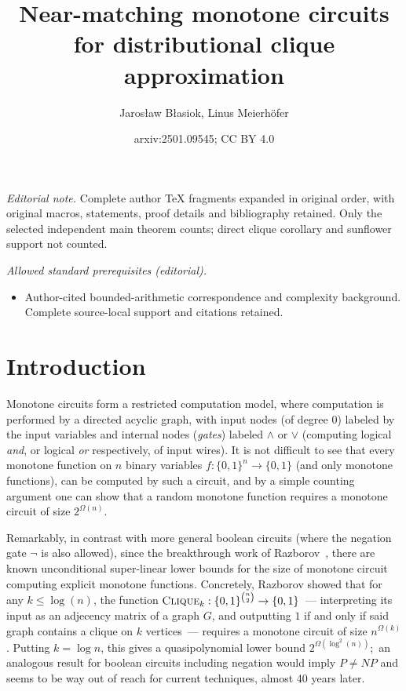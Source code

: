 \documentclass[10pt,a4paper]{article}
\title{Near-matching monotone circuits for distributional clique approximation}
\author{Jarosław Błasiok, Linus Meierhöfer}
\date{arxiv:2501.09545; CC BY 4.0}
\newcommand{\cliquep}{\textsc{Clique}}
\begin{document}
\maketitle
\noindent\textit{Editorial note.} Complete author TeX fragments expanded in original order, with original macros, statements, proof details and bibliography retained. Only the selected independent main theorem counts; direct clique corollary and sunflower support not counted.\par\medskip
\noindent\textit{Allowed standard prerequisites (editorial).}\begin{itemize}
\item Author-cited bounded-arithmetic correspondence and complexity background. Complete source-local support and citations retained.
\end{itemize}\medskip
\section{Introduction}
Monotone circuits form a restricted computation model, where computation is performed by a directed acyclic graph, with input nodes (of degree $0$) labeled by the input variables and internal nodes (\emph{gates}) labeled $\land$ or $\lor$ (computing logical \emph{and}, or logical \emph{or} respectively, of input wires). It is not difficult to see that every monotone function on $n$ binary variables $f:\{0, 1\}^n \to \{0, 1\}$ (and only monotone functions), can be computed by such a circuit, and by a simple counting argument one can show that a random monotone function requires a monotone circuit of size $2^{\Omega(n)}$. 

Remarkably, in contrast with more general boolean circuits (where the negation gate $\lnot$ is also allowed), since the breakthrough work of Razborov~\cite{razborov1985lower}, there are known unconditional super-linear lower bounds for the size of monotone circuit computing explicit monotone functions. Concretely, Razborov showed that for any $k \leq \log(n)$, the function $\cliquep_k : \{0,1\}^{\binom{n}{2}} \to \{0,1\}$~--- interpreting its input as an adjecency matrix of a graph $G$, and outputting $1$ if and only if said graph contains a clique on $k$ vertices~--- requires a monotone circuit of size $n^{\Omega(k)}$. Putting $k = \log n$, this gives a quasipolynomial lower bound $2^{\Omega(\log^2(n))}$;~an analogous result for boolean circuits including negation would imply $P \not=NP$ and seems to be way out of reach for current techniques, almost 40 years later.
\end{document}
